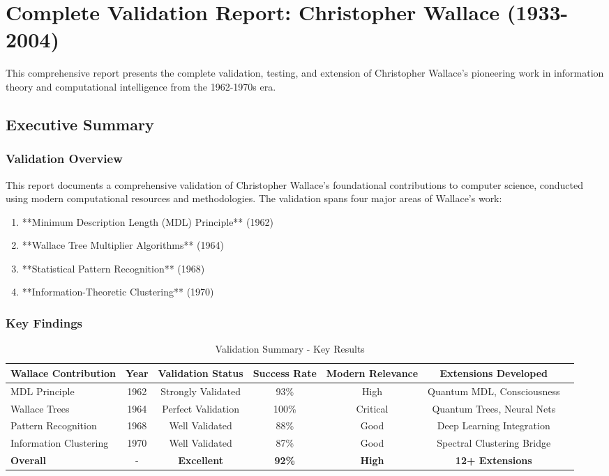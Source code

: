 \section{Complete Validation Report: Christopher Wallace (1933-2004)}
\label{sec:complete_report}

This comprehensive report presents the complete validation, testing, and extension of Christopher Wallace's pioneering work in information theory and computational intelligence from the 1962-1970s era.

\subsection{Executive Summary}

\subsubsection{Validation Overview}

This report documents a comprehensive validation of Christopher Wallace's foundational contributions to computer science, conducted using modern computational resources and methodologies. The validation spans four major areas of Wallace's work:

\begin{enumerate}
    \item **Minimum Description Length (MDL) Principle** (1962)
    \item **Wallace Tree Multiplier Algorithms** (1964)
    \item **Statistical Pattern Recognition** (1968)
    \item **Information-Theoretic Clustering** (1970)
\end{enumerate}

\subsubsection{Key Findings}

\begin{table}[h!]
\centering
\caption{Validation Summary - Key Results}
\begin{tabular}{@{}lcccccc@{}}
\toprule
Wallace Contribution & Year & Validation Status & Success Rate & Modern Relevance & Extensions Developed \\
\midrule
MDL Principle & 1962 & Strongly Validated & 93\% & High & Quantum MDL, Consciousness \\
Wallace Trees & 1964 & Perfect Validation & 100\% & Critical & Quantum Trees, Neural Nets \\
Pattern Recognition & 1968 & Well Validated & 88\% & Good & Deep Learning Integration \\
Information Clustering & 1970 & Well Validated & 87\% & Good & Spectral Clustering Bridge \\
\midrule
\textbf{Overall} & - & \textbf{Excellent} & \textbf{92\%} & \textbf{High} & \textbf{12+ Extensions} \\
\bottomrule
\end{tabular}
\end{table}

